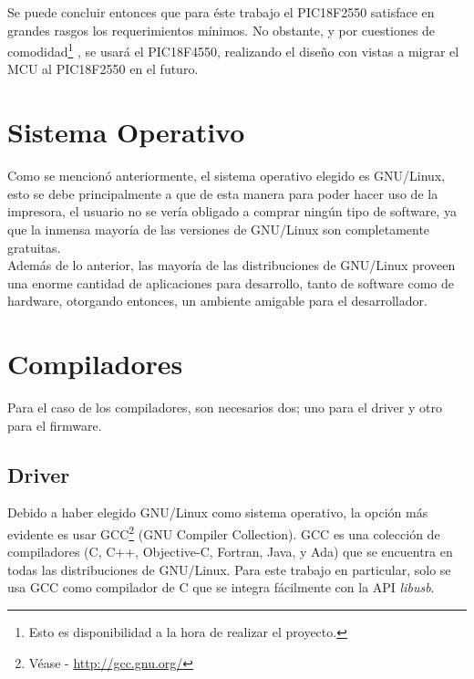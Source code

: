 Se puede concluir entonces que para \'este trabajo el PIC18F2550 satisface en
grandes rasgos los requerimientos m\'inimos. No obstante, y por cuestiones de
comodidad\footnote{Esto es disponibilidad a la hora de realizar el proyecto.}
, se usar\'a el PIC18F4550, realizando el dise\~no con vistas a migrar el MCU
al PIC18F2550 en el futuro.\\

\section{Sistema Operativo} %
Como se mencion\'o anteriormente, el sistema operativo elegido es GNU/Linux,
esto se debe principalmente a que de esta manera para poder hacer uso de la
impresora, el usuario no se ver\'ia obligado a comprar ning\'un tipo de
software,
ya que la inmensa mayor\'ia de las versiones de GNU/Linux son completamente
gratuitas.\\

Adem\'as de lo anterior, las mayor\'ia de las distribuciones de GNU/Linux
proveen una enorme cantidad de aplicaciones para desarrollo, tanto de software
como de hardware, otorgando entonces, un ambiente amigable para el
desarrollador.\\

\section{Compiladores} %
Para el caso de los compiladores, son necesarios dos; uno para el driver y
otro para el firmware.\\

\subsection{Driver}
Debido a haber elegido GNU/Linux como sistema operativo, la opci\'on m\'as
evidente es usar GCC\footnote{V\'ease - \url{http://gcc.gnu.org/}} (GNU
Compiler Collection). GCC es una colecci\'on de compiladores (C, C++,
Objective-C, Fortran, Java, y Ada) que se encuentra en todas las distribuciones
de GNU/Linux. Para este trabajo en particular, solo se usa GCC como compilador
de C que se integra f\'acilmente con la API \emph{libusb}.

